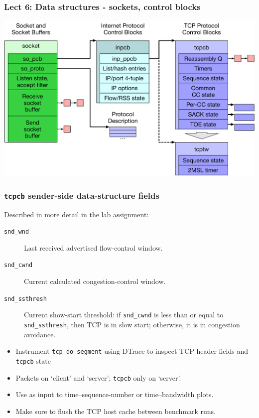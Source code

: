 \begin{frame}
  \frametitle{Lect 6: Data structures - sockets, control blocks}

  \begin{center}
    \includegraphics[width=\textwidth]{../../figures/tcp-structures.pdf}
  \end{center}
\end{frame}

\begin{frame}
  \frametitle{\texttt{tcpcb} sender-side data-structure fields}

  Described in more detail in the lab assignment:

  \medskip

  \begin{description}
    \item[\texttt{snd\_wnd}] Last received advertised flow-control window.
    \item[\texttt{snd\_cwnd}] Current calculated congestion-control window.
    \item[\texttt{snd\_ssthresh}] Current show-start threshold: if
      \texttt{snd\_cwnd} is less than or equal to \texttt{snd\_ssthresh}, then
      TCP is in slow start; otherwise, it is in congestion avoidance.
  \end{description}

  \medskip

  \begin{itemize}
    \item Instrument \texttt{tcp\_do\_segment} using DTrace to inspect TCP
      header fields and \texttt{tcpcb} state
    \item Packets on `client' and `server'; \texttt{tcpcb} only on `server'.
    \item Use as input to time--sequence-number or time--bandwidth plots.
    \item Make sure to flush the TCP host cache between benchmark runs.
  \end{itemize}
\end{frame}

